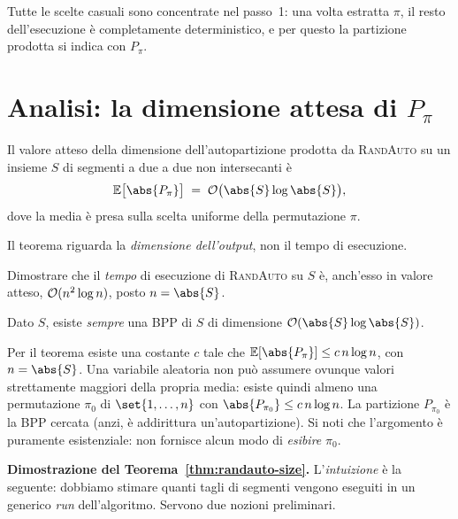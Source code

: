 Tutte le scelte casuali sono concentrate nel passo~1: una volta estratta $\pi$, il resto
dell'esecuzione è completamente deterministico, e per questo la partizione prodotta si indica
con $P_\pi$.

\section{Analisi: la dimensione attesa di \texorpdfstring{$P_\pi$}{P pi}}


\begin{teorema}\label{thm:randauto-size}
Il valore atteso della dimensione dell'autopartizione prodotta da \textsc{RandAuto} su un
insieme $S$ di segmenti a due a due non intersecanti è
\[
  \E\bigl[\abs{P_\pi}\bigr]\;=\;\Oh\bigl(\abs{S}\log\abs{S}\bigr),
\]
dove la media è presa sulla scelta uniforme della permutazione $\pi$.
\end{teorema}

Il teorema riguarda la \emph{dimensione dell'output}, non il tempo di esecuzione.

\begin{esercizio}
Dimostrare che il \emph{tempo} di esecuzione di \textsc{RandAuto} su $S$ è, anch'esso in
valore atteso, $\mathcal{O}(n^2\log n)$, posto $n=\abs{S}$.
\end{esercizio}

\begin{corollario}\label{cor:esiste-autopartizione}
Dato $S$, esiste \emph{sempre} una BPP di $S$ di dimensione $\Oh(\abs{S}\log\abs{S})$.
\end{corollario}

\begin{dimostrazione}
Per il teorema esiste una costante $c$ tale che $\E[\abs{P_\pi}]\le c\,n\log n$, con
$n=\abs{S}$. Una variabile aleatoria non può assumere ovunque valori strettamente maggiori
della propria media: esiste quindi almeno una permutazione $\pi_0$ di $\set{1,\dots,n}$ con
$\abs{P_{\pi_0}}\le c\,n\log n$. La partizione $P_{\pi_0}$ è la BPP cercata (anzi, è
addirittura un'autopartizione). Si noti che l'argomento è puramente esistenziale: non
fornisce alcun modo di \emph{esibire} $\pi_0$.
\end{dimostrazione}

\bigskip
\textbf{Dimostrazione del Teorema~\ref{thm:randauto-size}.}
L'\emph{intuizione} è la seguente: dobbiamo stimare quanti tagli di segmenti vengono eseguiti
in un generico \emph{run} dell'algoritmo. Servono due nozioni preliminari.

